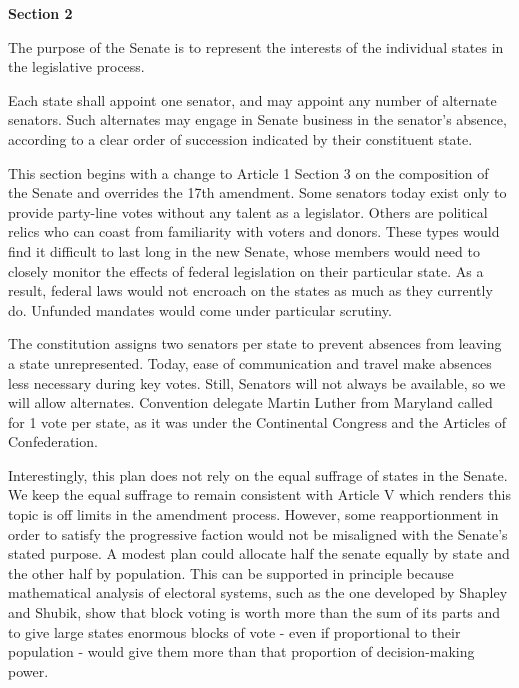 \documentclass{article}
\begin{document}
\begin{quoting}
\textbf{Section 2}

The purpose of the Senate is to represent the interests of the individual states in the legislative process.

Each state shall appoint one senator, and may appoint any number of alternate senators. Such alternates may engage in Senate business in the senator’s absence, according to a clear order of succession indicated by their constituent state.
\end{quoting}

This section begins with a change to Article 1 Section 3 on the composition of the Senate and overrides the 17th amendment. Some senators today exist only to provide party-line votes without any talent as a legislator. Others are political relics who can coast from familiarity with voters and donors. These types would find it difficult to last long in the new Senate, whose members would need to closely monitor the effects of federal legislation on their particular state. As a result, federal laws would not encroach on the states as much as they currently do. Unfunded mandates would come under particular scrutiny.

The constitution assigns two senators per state to prevent absences from leaving a state unrepresented. Today, ease of communication and travel make absences less necessary during key votes. Still, Senators will not always be available, so we will allow alternates. Convention delegate Martin Luther from Maryland called for 1 vote per state, as it was under the Continental Congress and the Articles of Confederation\cite{Senate}.

Interestingly, this plan does not rely on the equal suffrage of states in the Senate. We keep the equal suffrage to remain consistent with Article V which renders this topic is off limits in the amendment process\cite{Amar}. However, some reapportionment in order to satisfy the progressive faction would not be misaligned with the Senate's stated purpose. A modest plan could allocate half the senate equally by state and the other half by population. This can be supported in principle because mathematical analysis of electoral systems, such as the one developed by Shapley and Shubik\cite{Shapley}, show that block voting is worth more than the sum of its parts\cite{Gross} and to give large states enormous blocks of vote - even if proportional to their population - would give them more than that proportion of decision-making power.
\end{document}
